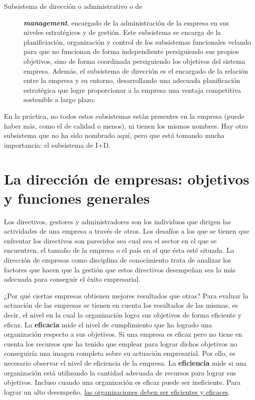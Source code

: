 \documentclass[12pt,a4paper,spanish]{report}
\begin{document}
\begin{description}
				\item[Subsistema de dirección o administrativo o de] \textbf{\textcolor[rgb]{0.5,0.8,0.9}{\emph{management}}}, encargado de la administración de la empresa en sus niveles estratégicos y de gestión. Este subsistema se encarga de la planificiación, organización y control de los subsistemas funcionales velando para que no funcionan de forma independiente persiguiendo sus propios objetivos, sino de forma coordinada persiguiendo los objetivos del sistema empresa. Además, el subsistema de dirección es el encargado de la relación entre la empresa y su entorno, desarrollando una adecuada planificación estratégica que logre proporcionar a la empresa una ventaja competitiva sostenible a largo plazo.
			\end{description}

			En la práctica, no todos estos subsistemas están presentes en la empresa (puede haber más, como el de calidad o menos), ni tienen los mismos nombres. Hay otro subsistema que no ha sido nombrado aquí, pero que está tomando mucha importancia: el subsistema de I+D.

		\section{\textcolor[rgb]{0.5,0.8,0.9}La dirección de empresas: objetivos y funciones generales}
			Los directivos, gestores y administradores son los individuos que dirigen las actividades de una empresa a través de otros. Los desafíos a los que se tienen que enfrentar los directivos son parecidos sea cual sea el sector en el que se encuentren, el tamaño de la empresa o el país en el que ésta esté situada. La dirección de empresas como disciplina de conocimiento trata de analizar los factores que hacen que la gestión que estos directivos desempeñan sea la más adecuada para conseguir el éxito empresarial.

			¿Por qué ciertas empresas obtienen mejores resultados que otras? Para evaluar la actuación de las empresas se tienen en cuenta los resultados de las mismas, es decir, el nivel en la cual la organización logra sus objetivos de forma eficiente y eficaz. La \textbf{eficacia} mide el nivel de cumplimiento que ha logrado una organización respecto a sus objetivos. Si una empresa es eficaz pero no tiene en cuenta los recursos que ha tenido que emplear para lograr dichos objetivos no conseguiría una imagen completa sobre su actuación empresarial. Por ello, es necesario observar el nivel de eficiencia de la empresa. La \textbf{eficiencia} mide si una organización está utilizando la cantidad adecuada de recursos para lograr sus objetivos. Incluso cuando una organización es eficaz puede ser ineficiente. Para lograr un alto desempeño, \underline{las organizaciones deben ser eficientes y eficaces}.
\end{document}
